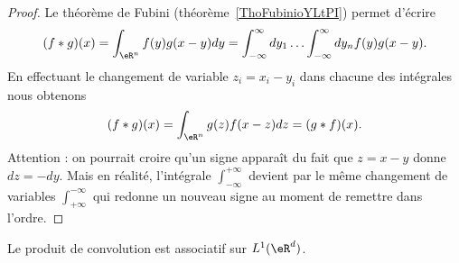 \begin{proof}
    Le théorème de Fubini (théorème~\ref{ThoFubinioYLtPI}) permet d'écrire
    \begin{equation}
        (f*g)(x)=\int_{\eR^n}f(y)g(x-y)dy=\int_{-\infty}^{\infty}dy_1\ldots \int_{-\infty}^{\infty}dy_nf(y)g(x-y).
    \end{equation}
    En effectuant le changement de variable \( z_i=x_i-y_i\) dans chacune des intégrales nous obtenons
    \begin{equation}
        (f*g)(x)=\int_{\eR^n}g(z)f(x-z)dz=(g*f)(x).
    \end{equation}
    Attention : on pourrait croire qu'un signe apparaît du fait que \( z=x-y\) donne \( dz=-dy\). Mais en réalité, l'intégrale \( \int_{-\infty}^{+\infty}\) devient par le même changement de variables \( \int_{+\infty}^{-\infty}\) qui redonne un nouveau signe au moment de remettre dans l'ordre.
\end{proof}

\begin{lemma}      \label{LEMooTUMSooSmnlHc}
    Le produit de convolution est associatif sur \( L^1(\eR^d)\).
\end{lemma}

